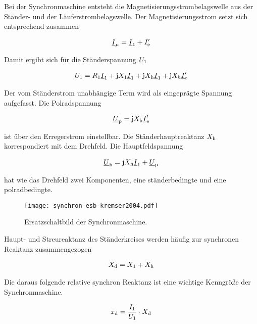 Bei der Synchronmaschine entsteht die Magnetisierungsstrombelagswelle aus der Ständer- und der Läuferstrombelagswelle.
Der Magnetisierungsstrom setzt sich entsprechend zusammen

\begin{align}
\underline{I}_\mu = \underline{I}_{\mathrm{1}} + I'_{\mathrm{e}}
\end{align}

Damit ergibt sich für die Ständerspannung $U_{\mathrm{1}}$

\begin{align}
U_{\mathrm{1}} = R_{\mathrm{1}}\underline{I}_{\mathrm{1}} + \mathrm{j}X_{\mathrm{1}}\underline{I}_{\mathrm{1}} + \mathrm{j}X_{\mathrm{h}}\underline{I}_{\mathrm{1}} + \mathrm{j}X_{h}\underline{I}'_{\mathrm{e}}
\end{align}

Der vom Ständerstrom unabhängige Term wird als eingeprägte Spannung aufgefasst.
Die Polradspannung

\begin{align}
\underline{U}_{\mathrm{p}} = \mathrm{j}X_{\mathrm{h}}\underline{I}'_{\mathrm{e}}
\end{align}

ist über den Erregerstrom einstellbar.
Die Ständerhauptreaktanz $X_{\mathrm{h}}$ korrespondiert mit dem Drehfeld.
Die Hauptfeldspannung

\begin{align}
\underline{U}_{\mathrm{h}} = \mathrm{j} X_{\mathrm{h}} \underline{I}_{\mathrm{1}} + \underline{U}_{\mathrm{p}}
\end{align}

hat wie das Drehfeld zwei Komponenten, eine ständerbedingte und eine polradbedingte.

\begin{figure}[!htb]
\centering
\texttt{[image: synchron-esb-kremser2004.pdf]}
\label{fig:esb-kremser}
\caption{Ersatzschaltbild der Synchronmaschine.}
\end{figure}

Haupt- und Streureaktanz des Ständerkreises werden häufig zur synchronen Reaktanz zusammengezogen

\begin{align}
X_{\mathrm{d}} = X_{\mathrm{1}} + X_{\mathrm{h}}
\end{align}

Die daraus folgende relative synchron Reaktanz ist eine wichtige Kenngröße der Synchronmaschine.

\begin{align}
x_{\mathrm{d}} = \frac{I_{\mathrm{1}}}{U_{\mathrm{1}}}\cdot X_{\mathrm{d}}
\end{align}

